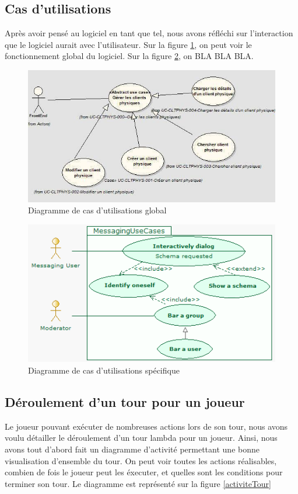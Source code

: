 \subsection{Cas d'utilisations}
Après avoir pensé au logiciel en tant que tel, nous avons réfléchi sur l'interaction que le logiciel aurait avec l'utilisateur. Sur la figure \ref{casdut1}, on peut voir le fonctionnement global du logiciel. Sur la figure \ref{casdut2}, on BLA BLA BLA.

\begin{figure}[!h] 
\centerline{\includegraphics[scale=0.60]{img/diag_cas_dut_ex.jpeg}}
   \caption{\label{étiquette} Diagramme de cas d'utilisations global}
\label{casdut1}
\end{figure}

\begin{figure}[!h] 
\centerline{\includegraphics[scale=0.60]{img/diag_cas_dut2_ex.jpeg}}
   \caption{\label{étiquette} Diagramme de cas d'utilisations spécifique}
\label{casdut2}
\end{figure}

\subsection{Déroulement d'un tour pour un joueur}
Le joueur pouvant exécuter de nombreuses actions lors de son tour, nous avons voulu détailler le déroulement d'un tour lambda pour un joueur. Ainsi, nous avons tout d'abord fait un diagramme d'activité permettant une bonne visualisation d'ensemble du tour. On peut voir toutes les actions réalisables, combien de fois le joueur peut les éxecuter, et quelles sont les conditions pour terminer son tour. Le diagramme est représenté sur la figure \ref{activiteTour}


